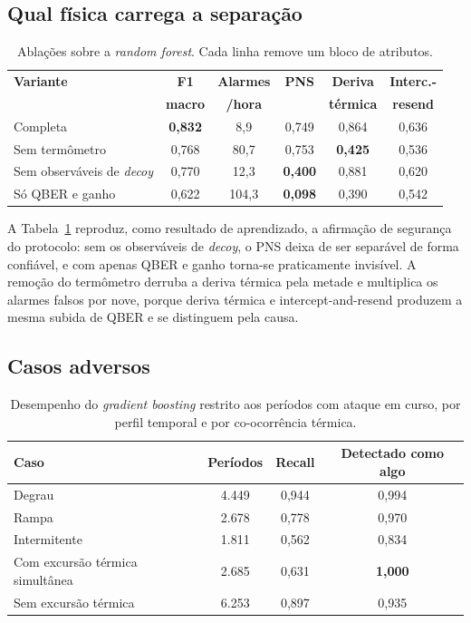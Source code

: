 \documentclass[12pt]{article}
\begin{document}
\subsection{Qual física carrega a separação}

\begin{table}[htbp]
\centering
\caption{Ablações sobre a \emph{random forest}. Cada linha remove um bloco de
atributos.}
\label{tab:ablacoes}
\footnotesize
\setlength{\tabcolsep}{4.5pt}
\begin{tabular}{@{}lccccc@{}}
\toprule
\textbf{Variante} & \textbf{F1} & \textbf{Alarmes} & \textbf{PNS} & \textbf{Deriva} & \textbf{Interc.-} \\
 & \textbf{macro} & \textbf{/hora} & & \textbf{térmica} & \textbf{resend} \\
\midrule
Completa                      & \textbf{0,832} & 8,9   & 0,749 & 0,864 & 0,636 \\
Sem termômetro                & 0,768 & 80,7  & 0,753 & \textbf{0,425} & 0,536 \\
Sem observáveis de \emph{decoy} & 0,770 & 12,3  & \textbf{0,400} & 0,881 & 0,620 \\
Só QBER e ganho               & 0,622 & 104,3 & \textbf{0,098} & 0,390 & 0,542 \\
\bottomrule
\end{tabular}
\end{table}

A Tabela~\ref{tab:ablacoes} reproduz, como resultado de aprendizado, a afirmação
de segurança do protocolo: sem os observáveis de \emph{decoy}, o PNS deixa de ser
separável de forma confiável, e com apenas QBER e ganho torna-se praticamente
invisível. A remoção do termômetro derruba a deriva térmica pela metade e
multiplica os alarmes falsos por nove, porque deriva térmica e
intercept-and-resend produzem a mesma subida de QBER e se distinguem pela causa.

\subsection{Casos adversos}

\begin{table}[htbp]
\centering
\caption{Desempenho do \emph{gradient boosting} restrito aos períodos com ataque
em curso, por perfil temporal e por co-ocorrência térmica.}
\label{tab:adversos}
\small
\begin{tabular}{@{}lccc@{}}
\toprule
\textbf{Caso} & \textbf{Períodos} & \textbf{Recall} & \textbf{Detectado como algo} \\
\midrule
Degrau                           & 4.449 & 0,944 & 0,994 \\
Rampa                            & 2.678 & 0,778 & 0,970 \\
Intermitente                     & 1.811 & 0,562 & 0,834 \\
Com excursão térmica simultânea  & 2.685 & 0,631 & \textbf{1,000} \\
Sem excursão térmica             & 6.253 & 0,897 & 0,935 \\
\bottomrule
\end{tabular}
\end{table}
\end{document}
